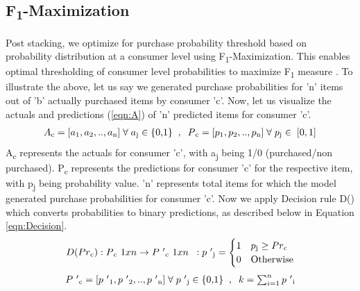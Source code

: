 \subsection{F\textsubscript{1}-Maximization}
Post stacking, we optimize for purchase probability threshold based on
probability distribution at a consumer level using F\textsubscript{1}-Maximization.
This enables optimal thresholding of consumer level probabilities to  maximize F\textsubscript{1} measure \cite{lipton2014optimal}.
To illustrate the above, let us say we generated purchase probabilities for 
'n' items out of 'b' actually purchased items by consumer 'c'. Now, let us visualize the actuals
and predictions (\ref{eqn:A})  of 'n' predicted items for consumer 'c'.
  \begin{equation}
    \begin{array}{l}
      A\textsubscript{c} = [a\textsubscript{1}, a\textsubscript{2}, .., a\textsubscript{n}] 
       \; \forall \; a\textsubscript{j} \in \; $\{0,1\}$ \;\;,\;\;
      P\textsubscript{c} = [p\textsubscript{1}, p\textsubscript{2}, .., p\textsubscript{n}]
      \; \forall \; p\textsubscript{j} \in \; [0,1]
    \end{array}
    \label{eqn:A}
  \end{equation}
A\textsubscript{c} represents the actuals for consumer 'c', with a\textsubscript{j} being 1/0 
(purchased/non purchased). P\textsubscript{c} represents the predictions 
for consumer 'c' for the respective item, with p\textsubscript{j} being probability value. 
'n' represents total items for which the model generated purchase probabilities for consumer 'c'.
Now we apply Decision rule D() which converts probabilities to binary predictions, as described below 
in Equation \ref{eqn:Decision}.
  \begin{equation}
    \begin{array}{l}
      D(Pr\textsubscript{c}) : P\textsubscript{c}\textsuperscript{1 x n}
      \to P\textsuperscript{'}\textsubscript{c}\textsuperscript{1 x n}
      \;\; : p\textsuperscript{'}\textsubscript{j} = 
        \begin{cases}
          1 & p\textsubscript{j} \geq Pr\textsubscript{c} \\
          0 & \text{Otherwise}
        \end{cases}
    \end{array}
    \label{eqn:Decision}
  \end{equation}
  \begin{equation}
    \begin{array}{l}
      P\textsuperscript{'}\textsubscript{c} = [p\textsuperscript{'}\textsubscript{1}, 
      p\textsuperscript{'}\textsubscript{2}, .., p\textsuperscript{'}\textsubscript{n}]\; 
      \forall \; p\textsuperscript{'}\textsubscript{j} \in \; $\{0,1\}$ \;\;,\;\;
      k =\sum_{i=1}^{n}p\textsuperscript{'}\textsubscript{i}
    \end{array}
    \label{eqn:Pdash}
  \end{equation}

